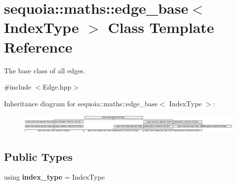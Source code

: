 \hypertarget{classsequoia_1_1maths_1_1edge__base}{}\section{sequoia\+::maths\+::edge\+\_\+base$<$ Index\+Type $>$ Class Template Reference}
\label{classsequoia_1_1maths_1_1edge__base}


The base class of all edges.  




{\ttfamily \#include $<$Edge.\+hpp$>$}

Inheritance diagram for sequoia\+::maths\+::edge\+\_\+base$<$ Index\+Type $>$\+:\begin{figure}[H]
\begin{center}
\leavevmode
\includegraphics[height=0.934891cm]{classsequoia_1_1maths_1_1edge__base}
\end{center}
\end{figure}
\subsection*{Public Types}
\begin{DoxyCompactItemize}
\item 
\mbox{\label{classsequoia_1_1maths_1_1edge__base_af23ce38501c44d512a575cd6d49945b2}} 
using {\bfseries index\+\_\+type} = Index\+Type
\end{DoxyCompactItemize}
